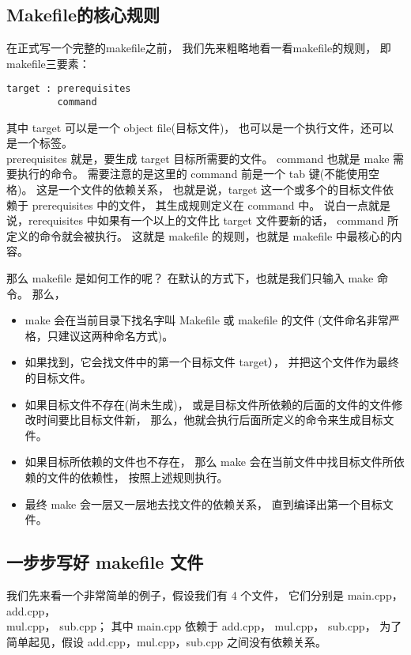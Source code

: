 \subsection{Makefile的核心规则}

在正式写一个完整的makefile之前，
我们先来粗略地看一看makefile的规则，
即makefile三要素：
\begin{verbatim}
target : prerequisites
         command
\end{verbatim}

其中 target 可以是一个 object file(目标文件)，
也可以是一个执行文件，还可以是一个标签。
\\prerequisites 就是，要生成 target 目标所需要的文件。
command 也就是 make 需要执行的命令。
需要注意的是这里的 command 前是一个 tab 键(不能使用空格)。
这是一个文件的依赖关系，
也就是说，target 这一个或多个的目标文件依赖于 prerequisites 中的文件，
其生成规则定义在 command 中。
说白一点就是说，rerequisites 中如果有一个以上的文件比 target 文件要新的话，
command 所定义的命令就会被执行。
这就是 makefile 的规则，也就是 makefile 中最核心的内容。

那么 makefile 是如何工作的呢？
在默认的方式下，也就是我们只输入 make 命令。
那么，
\begin{itemize}
	\item make 会在当前目录下找名字叫 Makefile 或 makefile 的文件
		(文件命名非常严格，只建议这两种命名方式)。
	\item 如果找到，它会找文件中的第一个目标文件 target），
		并把这个文件作为最终的目标文件。
	\item 如果目标文件不存在(尚未生成)，
		或是目标文件所依赖的后面的文件的文件修改时间要比目标文件新，
		那么，他就会执行后面所定义的命令来生成目标文件。
	\item 如果目标所依赖的文件也不存在，
		那么 make 会在当前文件中找目标文件所依赖的文件的依赖性，
		按照上述规则执行。
	\item 最终 make 会一层又一层地去找文件的依赖关系，
		直到编译出第一个目标文件。
\end{itemize}



\subsection{一步步写好 makefile 文件}

我们先来看一个非常简单的例子，假设我们有 4 个文件，
它们分别是 main.cpp，add.cpp，\\ mul.cpp， sub.cpp；
其中 main.cpp 依赖于 add.cpp， mul.cpp， sub.cpp，
为了简单起见，假设 add.cpp，mul.cpp，sub.cpp 之间没有依赖关系。

